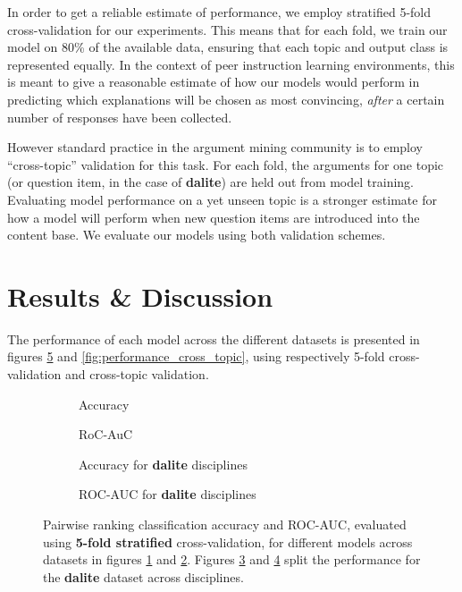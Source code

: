 \documentclass[runningheads]{llncs}
\begin{document}
In order to get a reliable estimate of performance, we employ stratified 5-fold 
cross-validation for our experiments.
This means that for each fold, we train our model on 80\% of the available 
data, ensuring that each topic and output class is represented equally. 
In the context of peer instruction learning environments, this is meant to give 
a reasonable estimate of how our models would perform in predicting which 
explanations will be chosen as most convincing, \textit{after} a certain number 
of responses have been collected.
 
However standard practice in the argument mining community is to employ 
``cross-topic'' validation for this task. 
For each fold, the arguments for one topic (or question item, in the case of 
\textbf{dalite}) are held out from model training.
Evaluating model performance on a yet unseen topic is a stronger estimate for 
how a model will perform when new question items are introduced into the 
content base.
We evaluate our models using both validation schemes.


\section{Results \& Discussion}

The performance of each model across the different datasets is presented 
in figures \ref{fig:performance_k_fold} and \ref{fig:performance_cross_topic}, 
using respectively 5-fold cross-validation and cross-topic validation.  

\begin{figure}
	\begin{subfigure}[t]{0.5\linewidth}
		\centering
		\scalebox{0.4}{}
		\caption{Accuracy}
		\label{fig:acc_kfold}
	\end{subfigure}%
	\qquad
	\begin{subfigure}[t]{0.5\linewidth}
		\centering
		\scalebox{0.4}{}
		\caption{RoC-AuC}
		\label{fig:AUC_kfold}
	\end{subfigure}
	
	\begin{subfigure}[t]{0.5\linewidth}
		\centering
		\scalebox{0.4}{}
		\caption{Accuracy for \textbf{dalite} disciplines}
		\label{fig:acc_dalite_kfold}
	\end{subfigure}%
	\qquad
	\begin{subfigure}[t]{0.5\linewidth}
		\centering
		\scalebox{0.4}{}
		\caption{ROC-AUC for \textbf{dalite} disciplines}
		\label{fig:AUC_dalite_kfold}
	\end{subfigure}	
	\caption{Pairwise ranking classification accuracy and ROC-AUC, evaluated 
	using \textbf{5-fold stratified} cross-validation, for 
		different models across datasets in figures \ref{fig:acc_kfold} and 
		\ref{fig:AUC_kfold}. Figures \ref{fig:acc_dalite_kfold} and 
		\ref{fig:AUC_dalite_kfold} split the performance for the  
		\textbf{dalite} dataset across disciplines.}
	\label{fig:performance_k_fold}
\end{figure}
\end{document}
